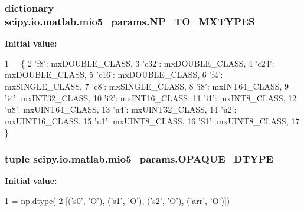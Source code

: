 \subsubsection[{N\+P\+\_\+\+T\+O\+\_\+\+M\+X\+T\+Y\+P\+E\+S}]{\setlength{\rightskip}{0pt plus 5cm}dictionary scipy.\+io.\+matlab.\+mio5\+\_\+params.\+N\+P\+\_\+\+T\+O\+\_\+\+M\+X\+T\+Y\+P\+E\+S}\label{namespacescipy_1_1io_1_1matlab_1_1mio5__params_aaeddecfc026604340fa79525ea8423b6}
{\bfseries Initial value\+:}
\begin{DoxyCode}
1 = \{
2     \textcolor{stringliteral}{'f8'}: mxDOUBLE\_CLASS,
3     \textcolor{stringliteral}{'c32'}: mxDOUBLE\_CLASS,
4     \textcolor{stringliteral}{'c24'}: mxDOUBLE\_CLASS,
5     \textcolor{stringliteral}{'c16'}: mxDOUBLE\_CLASS,
6     \textcolor{stringliteral}{'f4'}: mxSINGLE\_CLASS,
7     \textcolor{stringliteral}{'c8'}: mxSINGLE\_CLASS,
8     \textcolor{stringliteral}{'i8'}: mxINT64\_CLASS,
9     \textcolor{stringliteral}{'i4'}: mxINT32\_CLASS,
10     \textcolor{stringliteral}{'i2'}: mxINT16\_CLASS,
11     \textcolor{stringliteral}{'i1'}: mxINT8\_CLASS,
12     \textcolor{stringliteral}{'u8'}: mxUINT64\_CLASS,
13     \textcolor{stringliteral}{'u4'}: mxUINT32\_CLASS,
14     \textcolor{stringliteral}{'u2'}: mxUINT16\_CLASS,
15     \textcolor{stringliteral}{'u1'}: mxUINT8\_CLASS,
16     \textcolor{stringliteral}{'S1'}: mxUINT8\_CLASS,
17     \}
\end{DoxyCode}
\hypertarget{namespacescipy_1_1io_1_1matlab_1_1mio5__params_acd6cd0bfb7292dc26428e3d1bc83d3a9}{}
\subsubsection[{O\+P\+A\+Q\+U\+E\+\_\+\+D\+T\+Y\+P\+E}]{\setlength{\rightskip}{0pt plus 5cm}tuple scipy.\+io.\+matlab.\+mio5\+\_\+params.\+O\+P\+A\+Q\+U\+E\+\_\+\+D\+T\+Y\+P\+E}\label{namespacescipy_1_1io_1_1matlab_1_1mio5__params_acd6cd0bfb7292dc26428e3d1bc83d3a9}
{\bfseries Initial value\+:}
\begin{DoxyCode}
1 = np.dtype(
2     [(\textcolor{stringliteral}{'s0'}, \textcolor{stringliteral}{'O'}), (\textcolor{stringliteral}{'s1'}, \textcolor{stringliteral}{'O'}), (\textcolor{stringliteral}{'s2'}, \textcolor{stringliteral}{'O'}), (\textcolor{stringliteral}{'arr'}, \textcolor{stringliteral}{'O'})])
\end{DoxyCode}
